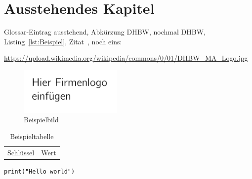\section{Ausstehendes Kapitel}

Glossar\hyp{}Eintrag \gls{ausstehend}, Abkürzung \ac{DHBW}, nochmal \ac{DHBW}, Listing~\ref{lst:Beispiel}, Zitat~\parencite[vgl.][S.~1]{BookKey}, noch eins: \cite{OnlineKey}

\begin{sloppypar}
\url{https://upload.wikimedia.org/wikipedia/commons/0/01/DHBW_MA_Logo.jpg}
\end{sloppypar}

\begin{figure}
    \begin{center}
        \includegraphics[width=5cm]{img/logo.png}
        \caption{Beispielbild}
    \end{center}
\end{figure}

\begin{table}
    \begin{center}
        \begin{tabular}{ll}
            Schlüssel&Wert
        \end{tabular}
        \caption{Beispieltabelle}
    \end{center}
\end{table}

\begin{lstfloat}
\begin{lstlisting}
print("Hello world")
\end{lstlisting}
\end{lstfloat}
